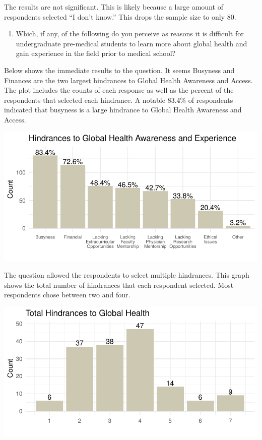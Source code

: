 \documentclass[
  letterpaper,
  DIV=11,
  numbers=noendperiod]{scrartcl}
\providecommand{\tightlist}{%
  \setlength{\itemsep}{0pt}\setlength{\parskip}{0pt}}\usepackage{longtable,booktabs,array}
\begin{document}
The results are not significant. This is likely because a large amount
of respondents selected ``I don't know.'' This drops the sample size to
only 80.

\newpage

\begin{enumerate}
\def\labelenumi{\arabic{enumi}.}
\setcounter{enumi}{3}
\tightlist
\item
  Which, if any, of the following do you perceive as reasons it is
  difficult for undergraduate pre-medical students to learn more about
  global health and gain experience in the field prior to medical
  school?
\end{enumerate}

Below shows the immediate results to the question. It seems Busyness and
Finances are the two largest hindrances to Global Health Awareness and
Access. The plot includes the counts of each response as well as the
percent of the respondents that selected each hindrance. A notable
83.4\% of respondents indicated that busyness is a large hindrance to
Global Health Awareness and Access.

\includegraphics{GlobalHealthQuartoHC_files/figure-pdf/unnamed-chunk-34-1.pdf}

The question allowed the respondents to select multiple hindrances. This
graph shows the total number of hindrances that each respondent
selected. Most respondents chose between two and four.

\includegraphics{GlobalHealthQuartoHC_files/figure-pdf/unnamed-chunk-35-1.pdf}
\end{document}
